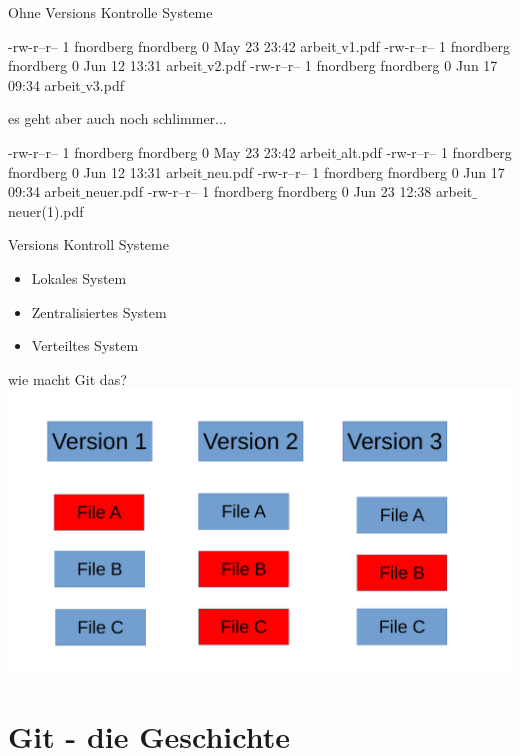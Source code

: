 \documentclass{beamer}
\begin{document}
\begin{frame}{Ohne Versions Kontrolle Systeme} 

-rw-r--r-- 1 fnordberg fnordberg 0 May 23 23:42 arbeit$\_$v1.pdf
-rw-r--r-- 1 fnordberg fnordberg 0 Jun 12 13:31 arbeit$\_$v2.pdf
-rw-r--r-- 1 fnordberg fnordberg 0 Jun 17 09:34 arbeit$\_$v3.pdf

\end{frame}

\begin{frame}{es geht aber auch noch schlimmer...}

-rw-r--r-- 1 fnordberg fnordberg 0 May 23 23:42 arbeit$\_$alt.pdf
-rw-r--r-- 1 fnordberg fnordberg 0 Jun 12 13:31 arbeit$\_$neu.pdf
-rw-r--r-- 1 fnordberg fnordberg 0 Jun 17 09:34 arbeit$\_$neuer.pdf
-rw-r--r-- 1 fnordberg fnordberg 0 Jun 23 12:38 arbeit$\_$neuer(1).pdf

\end{frame}

\begin{frame}{Versions Kontroll Systeme}
    
    \begin{itemize}
        \item Lokales System
        \item Zentralisiertes System
        \item Verteiltes System
    \end{itemize}
\end{frame}
\begin{frame}{wie macht Git das?}
 \includegraphics[scale=0.5]{pictures/git-versionen.pdf}   
\end{frame}


\section{Git - die Geschichte}
\end{document}
